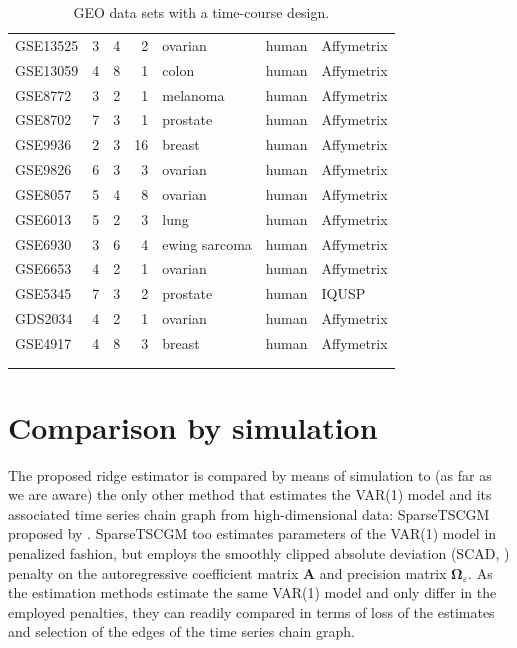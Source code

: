 \begin{table}
{\begin{tabular}{lrrrlll}
GSE13525	&	3	&	4	&	2	&	ovarian	&	human	&	Affymetrix	\\
GSE13059	&	4	&	8	&	1	&	colon	&	human	&	Affymetrix	\\
GSE8772	&	3	&	2	&	1	&	melanoma	&	human	&	Affymetrix	\\
GSE8702	&	7	&	3	&	1	&	prostate	&	human	&	Affymetrix	\\
GSE9936	&	2	&	3	&	16	&	breast	&	human	&	Affymetrix	\\
GSE9826	&	6	&	3	&	3	&	ovarian	&	human	&	Affymetrix	\\
GSE8057	&	5	&	4	&	8	&	ovarian	&	human	&	Affymetrix	\\
GSE6013	&	5	&	2	&	3	&	lung	&	human 	&	Affymetrix	\\
GSE6930	&	3	&	6	&	4	&	ewing sarcoma	&	human	&	Affymetrix	\\
GSE6653	&	4	&	2	&	1	&	ovarian	&	human	&	Affymetrix	\\
GSE5345	&	7	&	3	&	2	&	prostate	&	human	&	IQUSP	\\
GDS2034	&	4	&	2	&	1	&	ovarian 	&	human	&	Affymetrix	\\
GSE4917	&	4	&	8	&	3	&	breast	&	human 	&	Affymetrix	\\
& & & & & &
\\
\hline & & & & & & \\
\end{tabular}
}
\label{tableSM:GEOdatasets}
\caption{GEO data sets with a time-course design.}
\end{table}




\newpage
\section{Comparison by simulation}
The proposed ridge estimator is compared by means of simulation to (as far as we are aware) the only other method that estimates the VAR(1) model and its associated time series chain graph from high-dimensional data: SparseTSCGM proposed by \cite{Abegaz2013}. SparseTSCGM too estimates parameters of the VAR(1) model in penalized fashion, but employs the smoothly clipped absolute deviation (SCAD, \cite{Fan2001}) penalty on the autoregressive coefficient matrix $\mathbf{A}$ and precision matrix $\mathbf{\Omega}_{\varepsilon}$. As the estimation methods estimate the same VAR(1) model and only differ in the employed penalties, they can readily compared in terms of loss of the estimates and selection of the edges of the time series chain graph.

